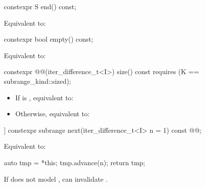 \documentclass{wg21}
\begin{document}
%
\begin{itemdecl}
	constexpr S end() const;
\end{itemdecl}

\begin{itemdescr}
	\pnum
	\effects
	Equivalent to: 
\end{itemdescr}

%
\begin{itemdecl}
	constexpr bool empty() const;
\end{itemdecl}

\begin{itemdescr}
	\pnum
	\effects
	Equivalent to: 
\end{itemdescr}

%
\begin{itemdecl}
	constexpr @@(iter_difference_t<I>) size() const
	requires (K == subrange_kind::sized);
\end{itemdecl}

\begin{itemdescr}
	\pnum
	\effects
	\begin{itemize}
		\item If  is , equivalent to: 
		\item Otherwise, equivalent to: 
	\end{itemize}
\end{itemdescr}

%
\begin{itemdecl}
	[[nodiscard]] constexpr subrange next(iter_difference_t<I> n = 1) const
	@@;
\end{itemdecl}

\begin{itemdescr}
	\pnum
	\effects
	Equivalent to:
	\begin{codeblock}
		auto tmp = *this;
		tmp.advance(n);
		return tmp;
	\end{codeblock}
	
	\pnum
	\begin{removedblock}
	\begin{note}
		If  does not model , 
		can invalidate .
	\end{note}
\end{removedblock}
\end{itemdescr}
\end{document}
